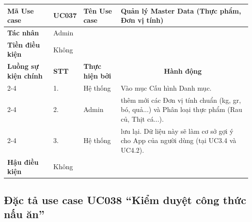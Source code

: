 \documentclass[../main.tex]{subfiles}
\begin{document}
\begin{longtable}{|p{2.7cm}|p{0.8cm}|p{2.6cm}|p{7.3cm}|}
\hline
\cellcolor[HTML]{D5F5E3}\textbf{Mã Use case} & \multicolumn{1}{l|}{UC037} & \cellcolor[HTML]{D5F5E3}\textbf{Tên Use case} & Quản lý Master Data (Thực phẩm, Đơn vị tính) \\ \hline
\cellcolor[HTML]{D5F5E3}\textbf{Tác nhân} & \multicolumn{3}{p{10.7cm}|}{Admin} \\ \hline
\cellcolor[HTML]{D5F5E3}\textbf{Tiền điều kiện} & \multicolumn{3}{p{10.7cm}|}{Không} \\ \hline

\cellcolor[HTML]{D5F5E3}\textbf{Luồng sự kiện chính} & \cellcolor[HTML]{FDEBD0}\textbf{STT} & \cellcolor[HTML]{FDEBD0}\textbf{Thực hiện bởi} & \multicolumn{1}{c|}{\cellcolor[HTML]{FDEBD0}\textbf{Hành động}} \\ \cline{2-4} 
\cellcolor[HTML]{D5F5E3} & 1. & Hệ thống & Vào mục Cấu hình Danh mục. \\ \cline{2-4} 
\cellcolor[HTML]{D5F5E3} & 2. & Admin & thêm mới các Đơn vị tính chuẩn (kg, gr, bó, quả...) và Phân loại thực phẩm (Rau củ, Thịt cá...). \\ \cline{2-4} 
\cellcolor[HTML]{D5F5E3} & 3. & Hệ thống & lưu lại. Dữ liệu này sẽ làm cơ sở gợi ý cho App của người dùng (tại UC3.4 và UC4.2). \\ \hline

\cellcolor[HTML]{D5F5E3}\textbf{Hậu điều kiện} & \multicolumn{3}{p{10.7cm}|}{Không} \\ \hline
\end{longtable}
\endgroup

\subsection{Đặc tả use case UC038 ``Kiểm duyệt công thức nấu ăn''}
\vspace{0.5cm}

\begingroup
\renewcommand{\arraystretch}{1.5}
\end{document}
